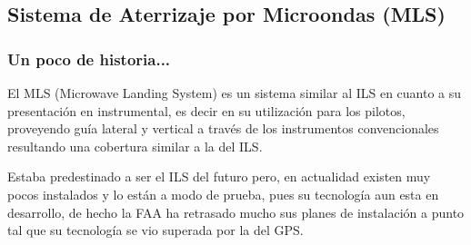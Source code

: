 



\subsection{Sistema de Aterrizaje por Microondas (MLS)}
\label{sec:06.MLS}

\subsubsection{Un poco de historia...}
\label{sec:06.MLS.historia}

El MLS (Microwave Landing System) es un sistema similar al ILS en cuanto a su presentación en
instrumental, es decir en su utilización para los pilotos, proveyendo guía lateral y vertical a través
de los instrumentos convencionales resultando una cobertura similar a la del ILS.

Estaba predestinado a ser el ILS del futuro pero, en actualidad existen muy pocos instalados y
lo están a modo de prueba, pues su tecnología aun esta en desarrollo, de hecho la FAA ha retrasado
mucho sus planes de instalación a punto tal que su tecnología se vio superada por la del GPS.

